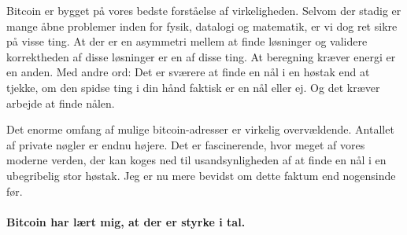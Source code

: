 \documentclass[paper=6in:9in,pagesize=pdftex,
               headinclude=on,footinclude=on,12pt]{scrbook}
\begin{document}
Bitcoin er bygget på vores bedste forståelse af virkeligheden. Selvom der stadig er mange åbne problemer inden for fysik, datalogi og matematik, er vi dog ret sikre på visse ting. At der er en asymmetri mellem at finde løsninger og validere korrektheden af disse løsninger er en af disse ting. At beregning kræver energi er en anden. Med andre ord: Det er sværere at finde en nål i en høstak end at tjekke, om den spidse ting i din hånd faktisk er en nål eller ej. Og det kræver arbejde at finde nålen.

Det enorme omfang af mulige bitcoin-adresser er virkelig overvældende. Antallet af private nøgler er endnu højere. Det er fascinerende, hvor meget af vores moderne verden, der kan koges ned til usandsynligheden af at finde en nål i en ubegribelig stor høstak. Jeg er nu mere bevidst om dette faktum end nogensinde før.\paragraph{Bitcoin har lært mig, at der er styrke i tal.}%
%
%
%
%
\end{document}
